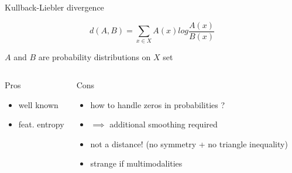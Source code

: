 \documentclass{beamer}
\begin{document}
\begin{frame}{Kullback-Liebler divergence}

$$d(A,B)= \sum_{x \in X}A(x)log\frac{A(x)}{B(x)}$$

\begin{scriptsize}
$A$ and $B$ are probability  distributions on $X$ set

\begin{center}
\end{center}






\begin{columns}[T,onlytextwidth]
\begin{block}{Pros}
\begin{itemize}
  \item well known
  \item  feat. entropy 
\end{itemize}
\end{block}
\begin{block}{Cons}
\begin{spacing}{0.9}
\begin{itemize}
  \item how to handle zeros in probabilities ? 
  \item $\implies$ additional smoothing required
  \item not a distance! (no symmetry + no triangle inequality)
  \item  strange if multimodalities
\end{itemize}
\end{spacing}
\end{block}
\end{columns}
\end{scriptsize}

\end{frame}
\end{document}

